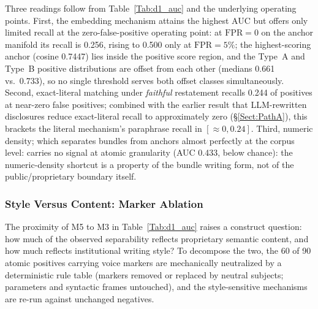 \documentclass[journal]{IEEEtran}
\begin{document}
Three readings follow from Table~\ref{Tab:d1_auc} and the underlying
operating points. First, the embedding mechanism attains the highest AUC but
offers only limited recall at the zero-false-positive operating point: at $\mathrm{FPR}=0$ on
the anchor manifold its recall is 0.256, rising to 0.500 only at
$\mathrm{FPR}=5\%$; the highest-scoring anchor (cosine 0.7447) lies inside
the positive score region, and the Type~A and Type~B positive distributions
are offset from each other (medians 0.661 vs.\ 0.733), so no single threshold
serves both offset classes simultaneously. Second, exact-literal matching
under \emph{faithful} restatement recalls 0.244 of positives at near-zero
false positives; combined with the earlier result that LLM-rewritten
disclosures reduce exact-literal recall to approximately zero
(\S\ref{Sect:PathA}), this brackets the literal mechanism's paraphrase recall
in $[\approx 0, 0.24]$. Third, numeric density; which separates bundles from
anchors almost perfectly at the corpus level: carries no signal at atomic
granularity (AUC 0.433, below chance): the numeric-density shortcut is a
property of the bundle writing form, not of the public/proprietary boundary
itself.

\subsubsection{Style Versus Content: Marker Ablation}
\label{Sect:V_E_2_D11}

The proximity of M5 to M3 in Table~\ref{Tab:d1_auc} raises a construct
question: how much of the observed separability reflects proprietary semantic
content, and how much reflects institutional writing style? To decompose the
two, the 60 of 90 atomic positives carrying voice markers are mechanically
neutralized by a deterministic rule table (markers removed or replaced by
neutral subjects; parameters and syntactic frames untouched), and the
style-sensitive mechanisms are re-run against unchanged negatives.

\begin{table}[!t]
    \centering
    \caption{Marker-style ablation: AUC before and after neutralizing institutional-voice markers in the positives.}
    \label{Tab:d11_ablation}
\end{table}
\end{document}
